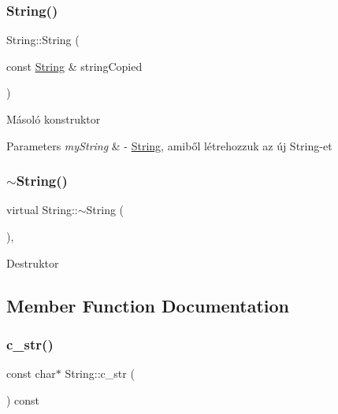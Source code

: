 \subsubsection{\texorpdfstring{String()}{String()}\hspace{0.1cm}{\footnotesize\ttfamily [3/3]}}
{\footnotesize\ttfamily String\+::\+String (\begin{DoxyParamCaption}\item[{const \mbox{\hyperlink{class_string}{String}} \&}]{string\+Copied }\end{DoxyParamCaption})}

Másoló konstruktor 
\begin{DoxyParams}{Parameters}
{\em my\+String} & -\/ \mbox{\hyperlink{class_string}{String}}, amiből létrehozzuk az új String-\/et \\
\hline
\end{DoxyParams}
\mbox{\label{class_string_ac73850e459f183bdd3c172e506be2a32}} 
\subsubsection{\texorpdfstring{$\sim$String()}{~String()}}
{\footnotesize\ttfamily virtual String\+::$\sim$\+String (\begin{DoxyParamCaption}{ }\end{DoxyParamCaption})\hspace{0.3cm}{\ttfamily [inline]}, {\ttfamily [virtual]}}

Destruktor 

\subsection{Member Function Documentation}
\mbox{\label{class_string_a0274f3e61533d15086816fb7f47ccb54}} 
\subsubsection{\texorpdfstring{c\_str()}{c\_str()}}
{\footnotesize\ttfamily const char$\ast$ String\+::c\+\_\+str (\begin{DoxyParamCaption}{ }\end{DoxyParamCaption}) const\hspace{0.3cm}{\ttfamily [inline]}}

